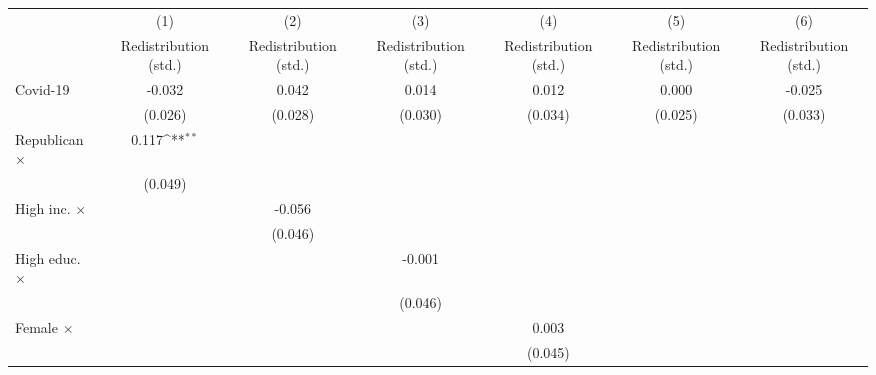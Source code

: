 {
\def\sym#1{\ifmmode^{#1}\else\(^{#1}\)\fi}
\begin{tabular}{l*{6}{c}}
\toprule
                    &\multicolumn{1}{c}{(1)}&\multicolumn{1}{c}{(2)}&\multicolumn{1}{c}{(3)}&\multicolumn{1}{c}{(4)}&\multicolumn{1}{c}{(5)}&\multicolumn{1}{c}{(6)}\\
                    &\multicolumn{1}{c}{Redistribution (std.)}&\multicolumn{1}{c}{Redistribution (std.)}&\multicolumn{1}{c}{Redistribution (std.)}&\multicolumn{1}{c}{Redistribution (std.)}&\multicolumn{1}{c}{Redistribution (std.)}&\multicolumn{1}{c}{Redistribution (std.)}\\
\midrule
Covid-19            &      -0.032         &       0.042         &       0.014         &       0.012         &       0.000         &      -0.025         \\
                    &     (0.026)         &     (0.028)         &     (0.030)         &     (0.034)         &     (0.025)         &     (0.033)         \\
\addlinespace
Republican $\times$ &       0.117\sym{**} &                     &                     &                     &                     &                     \\
                    &     (0.049)         &                     &                     &                     &                     &                     \\
\addlinespace
High inc. $\times$  &                     &      -0.056         &                     &                     &                     &                     \\
                    &                     &     (0.046)         &                     &                     &                     &                     \\
\addlinespace
High educ. $\times$ &                     &                     &      -0.001         &                     &                     &                     \\
                    &                     &                     &     (0.046)         &                     &                     &                     \\
\addlinespace
Female $\times$     &                     &                     &                     &       0.003         &                     &                     \\
                    &                     &                     &                     &     (0.045)         &                     &                     \\

\end{tabular}}
